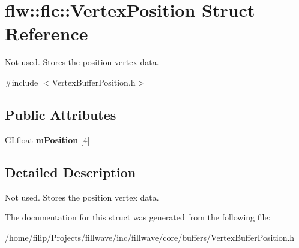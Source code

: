 \hypertarget{structflw_1_1flc_1_1VertexPosition}{}\section{flw\+:\+:flc\+:\+:Vertex\+Position Struct Reference}
\label{structflw_1_1flc_1_1VertexPosition}


Not used. Stores the position vertex data.  




{\ttfamily \#include $<$Vertex\+Buffer\+Position.\+h$>$}

\subsection*{Public Attributes}
\begin{DoxyCompactItemize}
\item 
G\+Lfloat {\bfseries m\+Position} \mbox{[}4\mbox{]}\hypertarget{structflw_1_1flc_1_1VertexPosition_a9f42294a01f445359f57ab3bceb26498}{}\label{structflw_1_1flc_1_1VertexPosition_a9f42294a01f445359f57ab3bceb26498}

\end{DoxyCompactItemize}


\subsection{Detailed Description}
Not used. Stores the position vertex data. 

The documentation for this struct was generated from the following file\+:\begin{DoxyCompactItemize}
\item 
/home/filip/\+Projects/fillwave/inc/fillwave/core/buffers/Vertex\+Buffer\+Position.\+h\end{DoxyCompactItemize}
